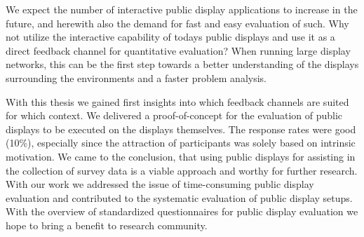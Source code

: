 	We expect the number of interactive public display applications to increase in the future, and herewith also the demand for fast and easy evaluation of such. Why not utilize the interactive capability of todays public displays and use it as a direct feedback channel for quantitative evaluation? When running large display networks, this can be the first step towards a better understanding of the displays surrounding the environments and a faster problem analysis.


	With this thesis we gained first insights into which feedback channels are suited for which context. We delivered a proof-of-concept for the evaluation of public displays to be executed on the displays themselves.
	The response rates were good (10\%), especially since the attraction of participants was solely based on intrinsic motivation. We came to the conclusion, that using public displays for assisting in the collection of survey data is a viable approach and worthy for further research.
	With our work we addressed the issue of time-consuming public display evaluation and contributed to the systematic evaluation of public display setups. With the overview of standardized questionnaires for public display evaluation we hope to bring a benefit to research community.







